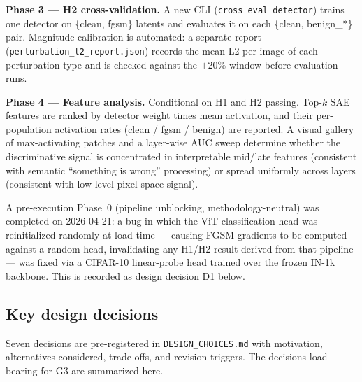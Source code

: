 \documentclass[../ppgc-tese.tex]{subfiles}
\begin{document}
\textbf{Phase 3 --- H2 cross-validation.} A new CLI (\texttt{cross\_eval\_detector}) trains one detector on \{clean, fgsm\} latents and evaluates it on each \{clean, benign\_$*$\} pair. Magnitude calibration is automated: a separate report (\texttt{perturbation\_l2\_report.json}) records the mean L2 per image of each perturbation type and is checked against the $\pm 20\%$ window before evaluation runs.

\textbf{Phase 4 --- Feature analysis.} Conditional on H1 and H2 passing. Top-$k$ SAE features are ranked by detector weight times mean activation, and their per-population activation rates (clean / fgsm / benign) are reported. A visual gallery of max-activating patches and a layer-wise AUC sweep determine whether the discriminative signal is concentrated in interpretable mid/late features (consistent with semantic ``something is wrong'' processing) or spread uniformly across layers (consistent with low-level pixel-space signal).

A pre-execution Phase~0 (pipeline unblocking, methodology-neutral) was completed on 2026-04-21: a bug in which the ViT classification head was reinitialized randomly at load time --- causing FGSM gradients to be computed against a random head, invalidating any H1/H2 result derived from that pipeline --- was fixed via a CIFAR-10 linear-probe head trained over the frozen IN-1k backbone. This is recorded as design decision D1 below.

\subsection{Key design decisions}
Seven decisions are pre-registered in \texttt{DESIGN\_CHOICES.md} with motivation, alternatives considered, trade-offs, and revision triggers. The decisions load-bearing for G3 are summarized here.
\end{document}
